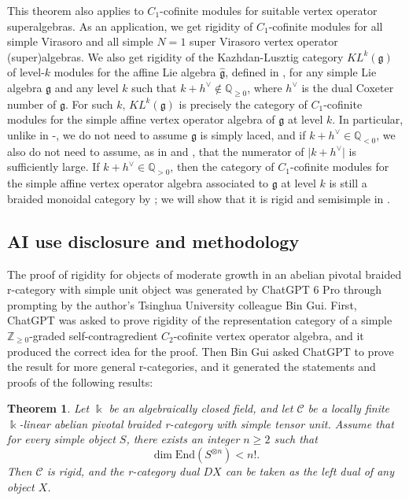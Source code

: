 \documentclass[11pt, reqno]{amsart}
\newtheorem{thm}{Theorem}[section]
\theoremstyle{definition}\newtheorem{defi}[thm]{Definition}
\theoremstyle{definition}\newtheorem{rem}[thm]{Remark}
\theoremstyle{definition}\newtheorem{exam}[thm]{Example}
\theoremstyle{definition}\newtheorem{assum}[thm]{Assumption}
\newcommand{\cC}{\mathcal{C}}
\newcommand{\ZZ}{\mathbb{Z}}
\newcommand{\QQ}{\mathbb{Q}}
\begin{document}
This theorem also applies to $C_1$-cofinite modules for suitable vertex operator superalgebras. As an application, we get rigidity of $C_1$-cofinite modules for all simple Virasoro and all simple $N=1$ super Virasoro vertex operator (super)algebras. We also get rigidity of the Kazhdan-Lusztig category $KL^k(\mathfrak{g})$ of level-$k$ modules for the affine Lie algebra $\widehat{\mathfrak{g}}$, defined in \cite[Definition 2.15]{KL1}, for any simple Lie algebra $\mathfrak{g}$ and any level $k$ such that $k+h^\vee\notin\QQ_{\geq 0}$, where $h^\vee$ is the dual Coxeter number of $\mathfrak{g}$. For such $k$, $KL^k(\mathfrak{g})$ is precisely the category of $C_1$-cofinite modules for the simple affine vertex operator algebra of $\mathfrak{g}$ at level $k$. In particular, unlike in \cite{KL1}-\cite{KL4}, we do not need to assume $\mathfrak{g}$ is simply laced, and if $k+h^\vee\in\QQ_{<0}$, we also do not need to assume, as in \cite{KL4} and \cite[Section 4.3]{EP}, that the numerator of $\vert k+h^\vee\vert$ is sufficiently large. If $k+h^\vee\in\QQ_{>0}$, then the category of $C_1$-cofinite modules for the simple affine vertex operator algebra associated to $\mathfrak{g}$ at level $k$ is still a braided monoidal category by \cite{Hu}; we will show that it is rigid and semisimple in \cite{McR3}.









\subsection{AI use disclosure and methodology}

The proof of rigidity for objects of moderate growth in an abelian pivotal braided r-category with simple unit object was generated by ChatGPT 6 Pro through prompting by the author's Tsinghua University colleague Bin Gui. First, ChatGPT was asked to prove rigidity of the representation category of a simple $\ZZ_{\geq 0}$-graded self-contragredient $C_2$-cofinite vertex operator algebra, and it produced the correct idea for the proof. Then Bin Gui asked ChatGPT to prove the result for more general r-categories, and it generated the statements and proofs of the following results:

\begin{thm}\label{thm:intro-ChatGPT}
Let $\Bbbk$ be an algebraically closed field, and let $\cC$ be a locally finite $\Bbbk$-linear abelian pivotal braided r-category with simple tensor unit. Assume that for every simple object $S$, there exists an integer $n\geq 2$ such that
\begin{equation*}
\dim\mathrm{End}(S^{\otimes n})<n!.
\end{equation*}
Then $\cC$ is rigid, and the r-category dual $DX$ can be taken as the left dual of any object $X$.
\end{thm}
\end{document}
